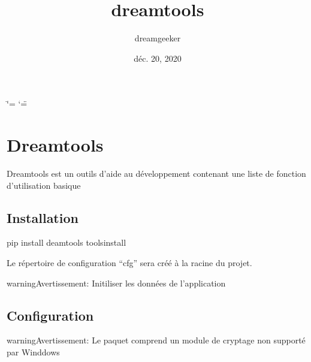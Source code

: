\documentclass[letterpaper,10pt,french]{sphinxmanual}
\title{dreamtools}
\date{déc. 20, 2020}
\author{dreamgeeker}
\begin{document}
\ifdefined\shorthandoff
  \ifnum\catcode`\=\string=\active\shorthandoff{=}\fi
  \ifnum\catcode`\"=\active{}\fi
\fi

\pagestyle{empty}
\sphinxmaketitle
\pagestyle{plain}
\sphinxtableofcontents
\pagestyle{normal}
\label{\detokenize{index::doc}}



\chapter{Dreamtools}
\label{\detokenize{readme:dreamtools}}\label{\detokenize{readme::doc}}
Dreamtools est un outils d’aide au développement contenant une liste de fonction d’utilisation basique


\section{Installation}
\label{\detokenize{readme:installation}}
\begin{sphinxVerbatim}[commandchars=\\\{\}]
\PYGZdl{} pip install deamtools
\PYGZdl{} tools\PYGZhy{}install
\end{sphinxVerbatim}

Le répertoire de configuration “cfg” sera créé à la racine du projet.

\begin{sphinxadmonition}{warning}{Avertissement:}
Initiliser les données de l’application
\end{sphinxadmonition}


\section{Configuration}
\label{\detokenize{readme:configuration}}
\begin{sphinxVerbatim}[commandchars=\\\{\}]
 

     
   
\end{sphinxVerbatim}

\begin{sphinxadmonition}{warning}{Avertissement:}
Le paquet comprend un module de cryptage non supporté par Winddows
\end{sphinxadmonition}
\end{document}
